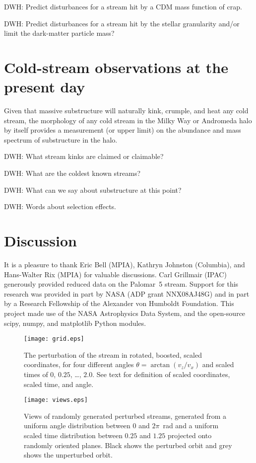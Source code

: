 \documentclass[12pt,preprint]{aastex}
\begin{document}
DWH: Predict disturbances for a stream hit by a CDM mass function of
crap.

DWH: Predict disturbances for a stream hit by the stellar granularity
and/or limit the dark-matter particle mass?

\section{Cold-stream observations at the present day}

Given that massive substructure will naturally kink, crumple, and heat
any cold stream, the morphology of any cold stream in the Milky Way or
Andromeda halo by itself provides a measurement (or upper limit) on
the abundance and mass spectrum of substructure in the halo.

DWH: What stream kinks are claimed or claimable?

DWH: What are the coldest known streams?

DWH: What can we say about substructure at this point?

DWH: Words about selection effects.

\section{Discussion}

\acknowledgments It is a pleasure to thank Eric Bell (MPIA), Kathryn
Johnston (Columbia), and Hans-Walter Rix (MPIA) for valuable
discussions.  Carl Grillmair (IPAC) generously provided reduced data
on the Palomar~5 stream.  Support for this research was provided in
part by NASA (ADP grant NNX08AJ48G) and in part by a Research
Fellowship of the Alexander von Humboldt Foundation. This project made
use of the NASA Astrophysics Data System, and the open-source scipy,
numpy, and matplotlib Python modules.

\clearpage
\begin{figure}
\begin{center}
\texttt{[image: grid.eps]}
\end{center}
\caption{The perturbation of the stream in rotated, boosted, scaled
  coordinates, for four different angles $\theta=\arctan(v_z/v_x)$ and
  scaled times of $0$, $0.25$, \ldots, $2.0$.  See text for definition
  of scaled coordinates, scaled time, and angle.\label{fig:grid}}
\end{figure}

\clearpage
\begin{figure}
\begin{center}
\texttt{[image: views.eps]}
\end{center}
\caption{Views of randomly generated perturbed streams, generated from
  a uniform angle distribution between $0$ and $2\pi$~rad and a
  uniform scaled time distribution between $0.25$ and $1.25$ projected
  onto randomly oriented planes.  Black shows the perturbed orbit and
  grey shows the unperturbed orbit.\label{fig:views}}
\end{figure}
\end{document}
